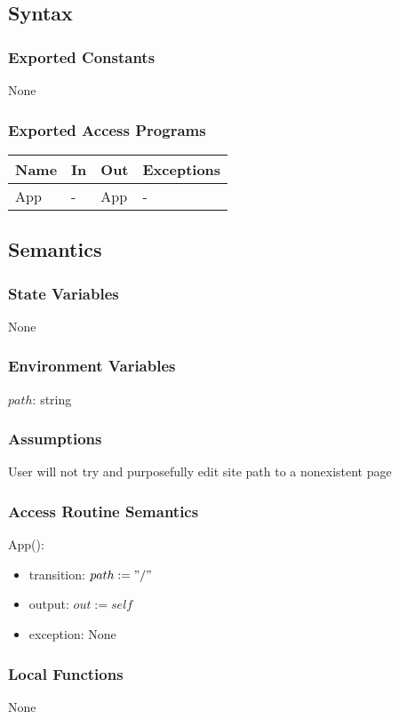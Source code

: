 \documentclass[12pt, titlepage]{article}
\begin{document}
\subsection{Syntax}
\subsubsection{Exported Constants}
None
\subsubsection{Exported Access Programs}
\begin{center}
	\begin{tabular}{p{3cm} p{4cm} p{4cm} p{3cm}}
		
		\hline
		\textbf{Name} & \textbf{In} & \textbf{Out} & \textbf{Exceptions} \\
		\hline
		App & - & App & - \\
		\hline
	\end{tabular}
\end{center}
\subsection{Semantics}
\subsubsection{State Variables}
None
\subsubsection{Environment Variables}
$path$: string
\subsubsection{Assumptions}
User will not try and purposefully edit site path to a nonexistent page
\subsubsection{Access Routine Semantics}
App():
\begin{itemize}
	\item transition: $path := "/"$
	\item output: $out := self$
	\item exception: None
\end{itemize}
\subsubsection{Local Functions}
None
\newpage
\end{document}
